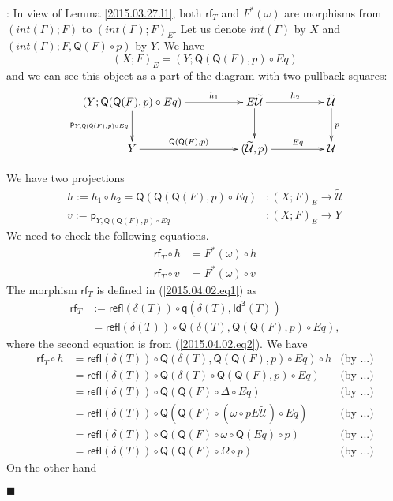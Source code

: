 \documentclass[12pt]{article}
\numberwithin{equation}{section}
\newenvironment{myproof}{{\bf Proof}:}{$\blacksquare$ \vskip 5mm }
\newcommand{\by}[1]{\text{(by #1)}}
\newcommand{\sr}{\rightarrow}
\newcommand{\wt}{\widetilde}
\newcommand{\p}{\mathsf{p}}
\newcommand{\q}{\mathsf{q}}
\newcommand{\Idx}{\mathsf{Id^3}} %
\newcommand{\refl}{\mathsf{refl}}
\newcommand{\U}{\mathcal{U}}
\newcommand{\rf}{\mathsf{rf}}
\newcommand{\Q}{\mathsf{Q}}
\begin{document}
\begin{myproof}
In view of Lemma \ref{2015.03.27.l1}, both $\rf_T$ and $F^*(\omega)$ are
morphisms from $(int(\Gamma);F)$ to $(int(\Gamma);F)_{E}$. Let us denote
$int(\Gamma)$ by $X$ and $(int(\Gamma);F,\Q(F)\circ p)$ by $Y$. We have
%
$$(X;F)_{E}=(Y;\Q(\Q(F),p)\circ Eq)$$
%
and we can see this object as a part of the diagram with two pullback squares:
%
$$
\begin{xy}
          \xymatrix@C=4pc{ (Y;\Q(\Q(F),p)\circ Eq) \ar[r]^-{h_1} \ar[d]_{\p_{Y,
                \Q(\Q(F),p)\circ Eq}} & E\wt{\U} \ar[r]^-{h_2} \ar[d] & \wt{\U}
            \ar[d]^{p} \\ Y \ar[r]^-{\Q(\Q(F),p)} & (\wt{\U},p) \ar[r]^-{Eq} & \U }
\end{xy}
$$

%
We have two projections
%
\begin{align*}
  h := h_1\circ h_2=\Q(\Q(\Q(F),p)\circ Eq)&:(X;F)_{E}\sr \wt{\U} \\
  v := \p_{Y,\Q(\Q(F),p)\circ Eq}&:(X;F)_{E} \sr Y
\end{align*}
%
We need to check the following equations.
%
\begin{align*}
  \rf_T\circ h &=F^*(\omega)\circ h \\
  \rf_T\circ v &=F^*(\omega)\circ v
\end{align*}
%
The morphism $\rf_T$ is defined in (\ref{2015.04.02.eq1}) as
%
\begin{align*}
  \rf_T
  & :=\refl(\delta(T))\circ \q(\delta(T),\Idx(T)) \\
  & = \refl(\delta(T))\circ \Q(\delta(T),\Q(\Q(F),p)\circ Eq),
\end{align*}
%
where the second equation is from (\ref{2015.04.02.eq2}).
%
We have
%
\begin{align*}
  \rf_T \circ h
  & = \refl(\delta(T))\circ \Q(\delta(T),\Q(\Q(F),p)\circ Eq)\circ h & \by{...}\\
  & = \refl(\delta(T))\circ \Q(\delta(T)\circ \Q(\Q(F),p)\circ Eq) & \by{...}\\
  & = \refl(\delta(T))\circ \Q(\Q(F)\circ \Delta\circ Eq) & \by{...}\\
  & = \refl(\delta(T))\circ \Q(\Q(F)\circ (\omega\circ pE\wt{\U})\circ Eq) & \by{...}\\
  & = \refl(\delta(T))\circ \Q(\Q(F)\circ \omega\circ \Q(Eq)\circ p) & \by{...}\\
  & = \refl(\delta(T))\circ \Q(\Q(F)\circ \Omega\circ p) & \by{...}
\end{align*}
%
On the other hand

\end{myproof}
\end{document}
